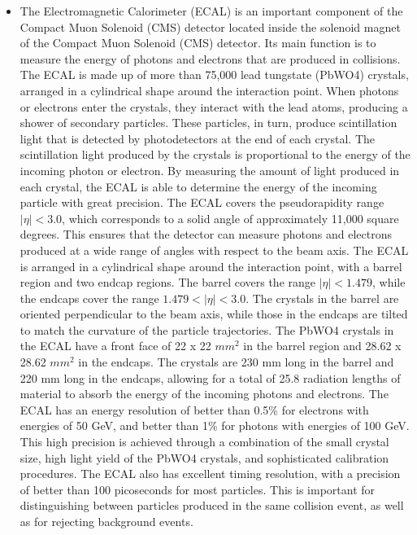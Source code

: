 \begin{itemize}
\item The Electromagnetic Calorimeter (ECAL) is an important component of the Compact Muon Solenoid (CMS) detector located inside the solenoid magnet of the Compact Muon Solenoid (CMS) detector. Its main function is to measure the energy of photons and electrons that are produced in collisions. The ECAL is made up of more than 75,000 lead tungstate (PbWO4) crystals, arranged in a cylindrical shape around the interaction point. When photons or electrons enter the crystals, they interact with the lead atoms, producing a shower of secondary particles. These particles, in turn, produce scintillation light that is detected by photodetectors at the end of each crystal. The scintillation light produced by the crystals is proportional to the energy of the incoming photon or electron. By measuring the amount of light produced in each crystal, the ECAL is able to determine the energy of the incoming particle with great precision. The ECAL covers the pseudorapidity range $|\eta| < 3.0$, which corresponds to a solid angle of approximately 11,000 square degrees. This ensures that the detector can measure photons and electrons produced at a wide range of angles with respect to the beam axis. The ECAL is arranged in a cylindrical shape around the interaction point, with a barrel region and two endcap regions. The barrel covers the range $|\eta| < 1.479$, while the endcaps cover the range $1.479 < |\eta| < 3.0$. The crystals in the barrel are oriented perpendicular to the beam axis, while those in the endcaps are tilted to match the curvature of the particle trajectories. The PbWO4 crystals in the ECAL have a front face of 22 x 22 $mm^2$ in the barrel region and 28.62 x 28.62 $mm^2$ in the endcaps. The crystals are 230 mm long in the barrel and 220 mm long in the endcaps, allowing for a total of 25.8 radiation lengths of material to absorb the energy of the incoming photons and electrons. The ECAL has an energy resolution of better than 0.5\% for electrons with energies of 50 GeV, and better than 1\% for photons with energies of 100 GeV. This high precision is achieved through a combination of the small crystal size, high light yield of the PbWO4 crystals, and sophisticated calibration procedures. The ECAL also has excellent timing resolution, with a precision of better than 100 picoseconds for most particles. This is important for distinguishing between particles produced in the same collision event, as well as for rejecting background events.



\end{itemize}
